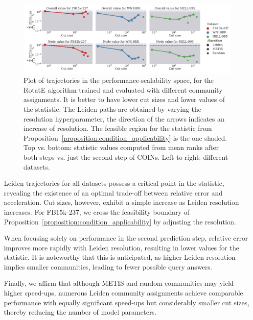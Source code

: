 \begin{figure}[!ht]
\begin{center}
\includegraphics[width=\linewidth]{figures/coins/feasibility_extra}
\end{center}
\caption[Plot of trajectories in the performance-scalability space, for the RotatE algorithm trained and evaluated with different community assignments.]{Plot of trajectories in the performance-scalability space, for the RotatE algorithm trained and evaluated with different community assignments. It is better to have lower cut sizes and lower values of the statistic. The Leiden paths are obtained by varying the resolution hyperparameter, the direction of the arrows indicates an increase of resolution. The feasible region for the statistic from Proposition~\ref{proposition:condition_applicability} is the one shaded. Top vs. bottom: statistic values computed from mean ranks after both steps vs. just the second step of COINs. Left to right: different datasets.}
\label{fig:feasibility_trajectories}
\end{figure}

Leiden trajectories for all datasets possess a critical point in the statistic, revealing the existence of an optimal trade-off between relative error and acceleration. Cut sizes, however, exhibit a simple increase as Leiden resolution increases. For FB15k-237, we cross the feasibility boundary of Proposition~\ref{proposition:condition_applicability} by adjusting the resolution. 

When focusing solely on performance in the second prediction step, relative error improves more rapidly with Leiden resolution, resulting in lower values for the statistic. It is noteworthy that this is anticipated, as higher Leiden resolution implies smaller communities, leading to fewer possible query answers. 

Finally, we affirm that although METIS and random communities may yield higher speed-ups, numerous Leiden community assignments achieve comparable performance with equally significant speed-ups but considerably smaller cut sizes, thereby reducing the number of model parameters.

